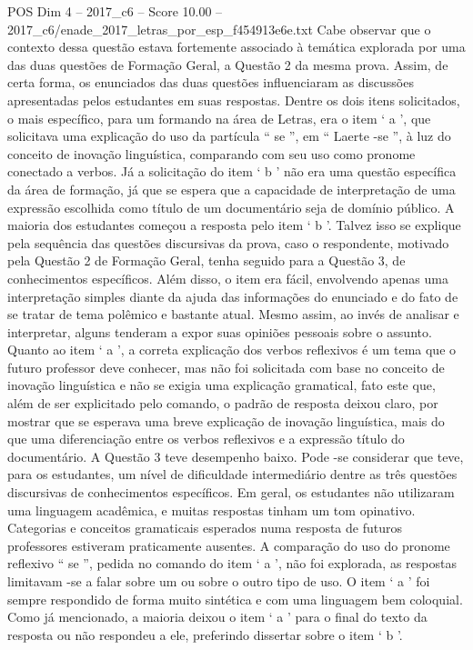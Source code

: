 \begin{textsample}{POS Dim 4 – 2017\_c6 – Score 10.00 – 2017\_c6/enade\_2017\_letras\_por\_esp\_f454913e6e.txt}
Cabe observar que o contexto dessa questão estava fortemente associado à temática explorada por uma das duas questões de Formação Geral, a Questão 2 da mesma prova.
Assim, de certa forma, os enunciados das duas questões influenciaram as discussões apresentadas pelos estudantes em suas respostas.
Dentre os dois itens solicitados, o mais específico, para um formando na área de Letras, era o item ‘ a ’, que solicitava uma explicação do uso da partícula “ se ”, em “ Laerte -se ”, à luz do conceito de inovação linguística, comparando com seu uso como pronome conectado a verbos.
Já a solicitação do item ‘ b ’ não era uma questão específica da área de formação, já que se espera que a capacidade de interpretação de uma expressão escolhida como título de um documentário seja de domínio público.
A maioria dos estudantes começou a resposta pelo item ‘ b ’.
Talvez isso se explique pela sequência das questões discursivas da prova, caso o respondente, motivado pela Questão 2 de Formação Geral, tenha seguido para a Questão 3, de conhecimentos específicos.
Além disso, o item era fácil, envolvendo apenas uma interpretação simples diante da ajuda das informações do enunciado e do fato de se tratar de tema polêmico e bastante atual.
Mesmo assim, ao invés de analisar e interpretar, alguns tenderam a expor suas opiniões pessoais sobre o assunto.
Quanto ao item ‘ a ’, a correta explicação dos verbos reflexivos é um tema que o futuro professor deve conhecer, mas não foi solicitada com base no conceito de inovação linguística e não se exigia uma explicação gramatical, fato este que, além de ser explicitado pelo comando, o padrão de resposta deixou claro, por mostrar que se esperava uma breve explicação de inovação linguística, mais do que uma diferenciação entre os verbos reflexivos e a expressão título do documentário.
A Questão 3 teve desempenho baixo.
Pode -se considerar que teve, para os estudantes, um nível de dificuldade intermediário dentre as três questões discursivas de conhecimentos específicos.
Em geral, os estudantes não utilizaram uma linguagem acadêmica, e muitas respostas tinham um tom opinativo.
Categorias e conceitos gramaticais esperados numa resposta de futuros professores estiveram praticamente ausentes.
A comparação do uso do pronome reflexivo “ se ”, pedida no comando do item ‘ a ’, não foi explorada, as respostas limitavam -se a falar sobre um ou sobre o outro tipo de uso.
O item ‘ a ’ foi sempre respondido de forma muito sintética e com uma linguagem bem coloquial.
Como já mencionado, a maioria deixou o item ‘ a ’ para o final do texto da resposta ou não respondeu a ele, preferindo dissertar sobre o item ‘ b ’.

\end{textsample}
